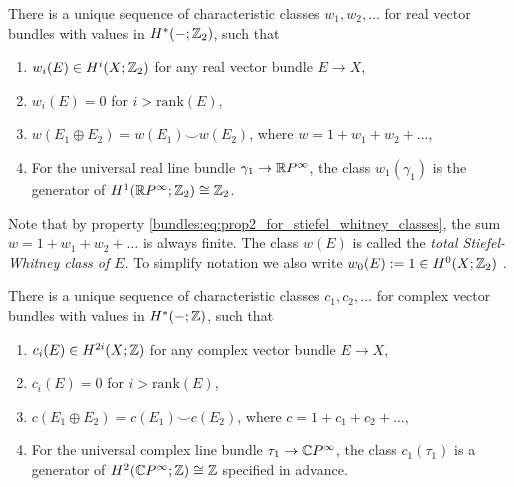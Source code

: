 \begin{definition}
    \label{bundles:def:Steifel_Whitney_Classes}
    There is a unique sequence of characteristic classes $w_1, w_2, \ldots$ for real vector bundles with values in $H^\ast(-;\mathbb{Z}_2)$, such that 
    \begin{enumerate}[label=(\roman*)]
        \item $w_i(E) \in H^i(X;\mathbb{Z}_2)$ for any real vector bundle $E \to X$,
        \item \label{bundles:eq:prop2_for_stiefel_whitney_classes} $w_i(E) = 0$ for $i > \mathrm{rank}(E)$,
        \item \label{bundles:eq:prop3_for_stiefel_whitney_classes} $w(E_1 \oplus E_2) = w(E_1) \smile w(E_2)$, where $w = 1 + w_1 + w_2 + \ldots$,
        \item \label{bundles:eq:prop4_for_stiefel_whitney_classes} For the universal real line bundle $\gamma_1 \to \mathbb{R} P^\infty$, the class $w_1(\gamma_1)$ is the generator of $H^1(\mathbb{R} P^\infty;\mathbb{Z}_2) \cong \mathbb{Z}_2$.
    \end{enumerate}
\end{definition}

Note that by property \ref{bundles:eq:prop2_for_stiefel_whitney_classes}, the sum $w = 1 + w_1 + w_2 + \ldots$ is always finite. The class \linebreak $w(E)$ is called the \textit{total Stiefel-Whitney class of $E$}. To simplify notation we also write \linebreak $w_0(E) := 1 \in H^0(X;\mathbb{Z}_2)$ .

\begin{definition}
    There is a unique sequence of characteristic classes $c_1, c_2, \ldots$ for complex vector bundles with values in $H^\ast(-;\mathbb{Z})$, such that 
    \begin{enumerate}[label=(\roman*)]
        \item $c_i(E) \in H^{2i}(X;\mathbb{Z})$ for any complex vector bundle $E \to X$,
        \item $c_i(E) = 0$ for $i > \mathrm{rank}(E)$,
        \item $c(E_1 \oplus E_2) = c(E_1) \smile c(E_2)$, where $c = 1 + c_1 + c_2 + \ldots$,
        \item For the universal complex line bundle $\tau_1 \to \mathbb{C} P^\infty$, the class $c_1(\tau_1)$ is a generator of $H^2(\mathbb{C} P^\infty;\mathbb{Z}) \cong \mathbb{Z}$ specified in advance.
    \end{enumerate}
\end{definition}

